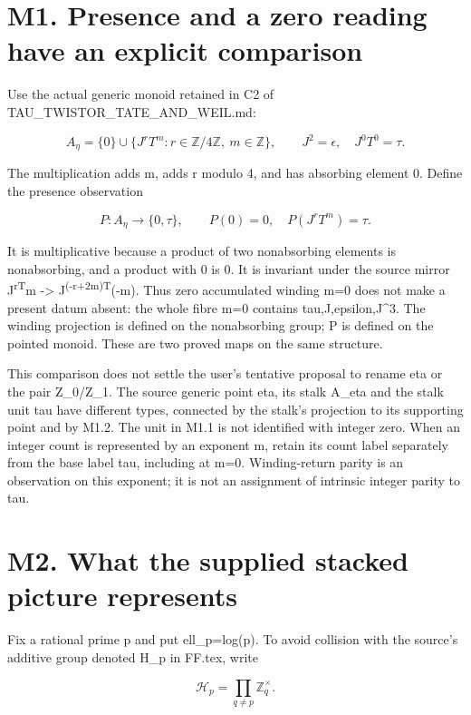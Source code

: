 \section{M1. Presence and a zero reading have an explicit
comparison}\label{m1.-presence-and-a-zero-reading-have-an-explicit-comparison}

Use the actual generic monoid retained in C2 of
TAU\_TWISTOR\_TATE\_AND\_WEIL.md:

\[
A_\eta=\{0\}\cup\{J^rT^m:r\in\mathbb Z/4\mathbb Z,\ m\in\mathbb Z\},
\qquad J^2=\epsilon,\quad J^0T^0=\tau.
\tag{M1.1}
\]

The multiplication adds m, adds r modulo 4, and has absorbing element 0.
Define the presence observation

\[
P:A_\eta\longrightarrow\{0,\tau\},\qquad
P(0)=0,\quad P(J^rT^m)=\tau.
\tag{M1.2}
\]

It is multiplicative because a product of two nonabsorbing elements is
nonabsorbing, and a product with 0 is 0. It is invariant under the
source mirror J\textsuperscript{rT}m -\textgreater{}
J\textsuperscript{(-r+2m)T}(-m). Thus zero accumulated winding m=0 does
not make a present datum absent: the whole fibre m=0 contains
tau,J,epsilon,J\^{}3. The winding projection is defined on the
nonabsorbing group; P is defined on the pointed monoid. These are two
proved maps on the same structure.

This comparison does not settle the user's tentative proposal to rename
eta or the pair Z\_0/Z\_1. The source generic point eta, its stalk
A\_eta and the stalk unit tau have different types, connected by the
stalk's projection to its supporting point and by M1.2. The unit in M1.1
is not identified with integer zero. When an integer count is
represented by an exponent m, retain its count label separately from the
base label tau, including at m=0. Winding-return parity is an
observation on this exponent; it is not an assignment of intrinsic
integer parity to tau.

\section{M2. What the supplied stacked picture
represents}\label{m2.-what-the-supplied-stacked-picture-represents}

Fix a rational prime p and put ell\_p=log(p). To avoid collision with
the source's additive group denoted H\_p in FF.tex, write

\[
\mathcal H_p=\prod_{q\ne p}\mathbb Z_q^\times.
\tag{M2.1}
\]

